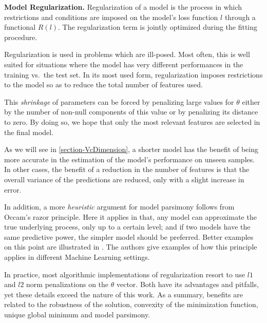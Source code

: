 \begin{definition}\textbf{Model Regularization.}
Regularization of a model is the process in which restrictions and conditions are imposed on the model's loss function $l$ through a functional $ R(l)$.
The regularization term is jointly optimized during the fitting procedure.
\end{definition}

Regularization is used in problems which are ill-posed.
Most often, this is well suited for situations where the model has very different performances in the training vs.\ the test set.
In its most used form, regularization imposes restrictions to the model so as to reduce the total number of features used.

This \textit{shrinkage} of parameters can be forced by penalizing large values for $\theta$ either by the number of non-null components of this value or by penalizing its distance to zero.
By doing so, we hope that only the most relevant features are selected in the final model.

As we will see in \cref{section-VcDimension}, a shorter model has the benefit of being more accurate in the estimation of the model's performance on unseen samples.
In other cases, the benefit of a reduction in the number of features is that the overall variance of the predictions are reduced, only with a slight increase in error.

In addition, a more \textit{heuristic} argument for model parsimony follows from Occam's razor principle.
Here it applies in that, any model can approximate the true underlying process, only up to a certain level; and if two models have the same predictive power, the simpler model should be preferred.
Better examples on this point are illustrated in \citep{rasmussenGhahramani2001occamsRazor}.
The authors give examples  of how this principle applies in different Machine Learning settings.


In practice, most algorithmic implementations of regularization resort to use $l1$ and $l2$ norm penalizations on the $\theta$ vector.
Both have its advantages and pitfalls, yet these details exceed the nature of this work.
As a summary, benefits are related to the robustness of the solution, convexity of the minimization function, unique global minimum and model parsimony.

